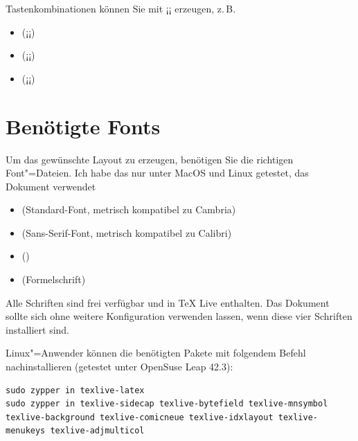 Tastenkombinationen können Sie mit ¡\keys¡ erzeugen, z.\,B.

\begin{itemize}
\item {} (¡¡)
\item {} (¡¡)
\item {} (¡¡)
\end{itemize}


\section{Benötigte Fonts}

Um das gewünschte Layout zu erzeugen, benötigen Sie die richtigen Font"=Dateien. Ich habe das nur unter MacOS und Linux getestet, das Dokument verwendet

\begin{itemize}
\item {} (Standard-Font, metrisch kompatibel zu Cambria)
\item {} (\textsf{Sans-Serif-Font}, metrisch kompatibel zu Calibri)
\item {} ()
\item {} (Formelschrift)
\end{itemize}
%
%
%
%

Alle Schriften sind frei verfügbar und in TeX Live enthalten. Das Dokument sollte sich ohne weitere Konfiguration verwenden lassen, wenn diese vier Schriften installiert sind. 

Linux"=Anwender können die benötigten Pakete mit folgendem Befehl nachinstallieren (getestet unter OpenSuse Leap 42.3):

\begin{lstlisting}[breaklines=true]
sudo zypper in texlive-latex
sudo zypper in texlive-sidecap texlive-bytefield texlive-mnsymbol texlive-background texlive-comicneue texlive-idxlayout texlive-menukeys texlive-adjmulticol 
\end{lstlisting}



